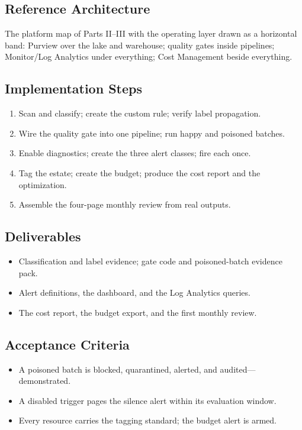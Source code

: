 \subsection*{Reference Architecture}
The platform map of Parts II--III with the operating layer drawn as a horizontal band: Purview over the lake and warehouse; quality gates inside pipelines; Monitor/Log Analytics under everything; Cost Management beside everything.

\subsection*{Implementation Steps}
\begin{enumerate}
    \item Scan and classify; create the custom rule; verify label propagation.
    \item Wire the quality gate into one pipeline; run happy and poisoned batches.
    \item Enable diagnostics; create the three alert classes; fire each once.
    \item Tag the estate; create the budget; produce the cost report and the optimization.
    \item Assemble the four-page monthly review from real outputs.
\end{enumerate}

\subsection*{Deliverables}
\begin{itemize}
    \item Classification and label evidence; gate code and poisoned-batch evidence pack.
    \item Alert definitions, the dashboard, and the Log Analytics queries.
    \item The cost report, the budget export, and the first monthly review.
\end{itemize}

\subsection*{Acceptance Criteria}
\begin{itemize}
    \item A poisoned batch is blocked, quarantined, alerted, and audited---demonstrated.
    \item A disabled trigger pages the silence alert within its evaluation window.
    \item Every resource carries the tagging standard; the budget alert is armed.
\end{itemize}

